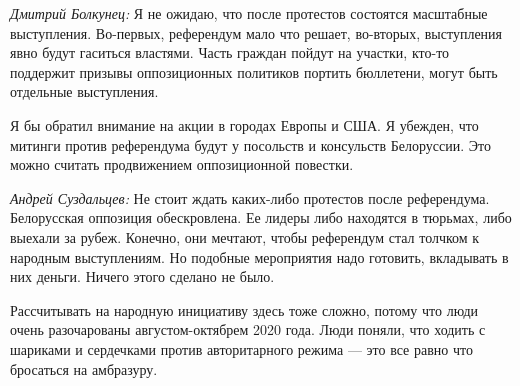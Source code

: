 \textit{Дмитрий Болкунец:} Я не ожидаю, что после протестов состоятся масштабные выступления. Во-первых, референдум мало что решает, во-вторых, выступления явно будут гаситься властями. Часть граждан пойдут на участки, кто-то поддержит призывы оппозиционных политиков портить бюллетени, могут быть отдельные выступления.

Я бы обратил внимание на акции в городах Европы и США. Я убежден, что митинги против референдума будут у посольств и консульств Белоруссии. Это можно считать продвижением оппозиционной повестки.

\textit{Андрей Суздальцев:} Не стоит ждать каких-либо протестов после референдума. Белорусская оппозиция обескровлена. Ее лидеры либо находятся в тюрьмах, либо выехали за рубеж. Конечно, они мечтают, чтобы референдум стал толчком к народным выступлениям. Но подобные мероприятия надо готовить, вкладывать в них деньги. Ничего этого сделано не было.

Рассчитывать на народную инициативу здесь тоже сложно, потому что люди очень разочарованы августом-октябрем 2020 года. Люди поняли, что ходить с шариками и сердечками против авторитарного режима — это все равно что бросаться на амбразуру.

